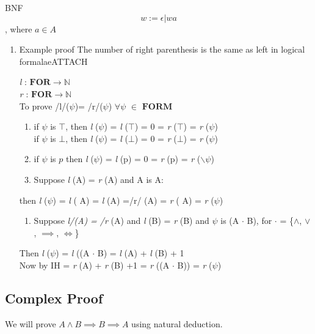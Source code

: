 \documentclass[11pt]{article}
\begin{document}
BNF \\
$$w:= \epsilon | wa$$,  where \(a\in A\)
\begin{enumerate}
\item Example proof The number of right parenthesis is the same as left in logical formalae\hfill{}\textsc{ATTACH}
\label{sec:orgd75f034}


\emph{l} : \(\mathbf{FOR} \rightarrow \mathbb{N}\) \\
\emph{r} : \(\mathbf{FOR} \rightarrow \mathbb{N}\) \\
To prove /l/(\(\psi\))= /r/(\(\psi\)) \(\forall \psi\) \(\in\) \(\mathbf{FORM}\)


\begin{enumerate}
\item if \(\psi\) is \(\top\), then \emph{l} (\(\psi\)) = \emph{l} (\(\top\)) = 0 = \emph{r} (\(\top\)) = \emph{r} (\(\psi\)) \\
if \(\psi\) is \(\bot\), then \emph{l} (\(\psi\)) = \emph{l} (\(\bot\)) = 0 = \emph{r} (\(\bot\)) = \emph{r} (\(\psi\))
\item if \(\psi\) is \(p\) then \emph{l} (\(\psi\)) = \emph{l} (p) = 0 = \emph{r} (p) = \emph{r} ($\backslash$\(\psi\))
\item Suppose \emph{l} (A) = \emph{r} (A) and A is \textlnot{} A: \\
\end{enumerate}
then \emph{l} (\(\psi\)) = \emph{l} (\textlnot{} A) = \emph{l} (A) =/r/ (A) = \emph{r} (\textlnot{} A) = \emph{r} (\(\psi\))
\begin{enumerate}
\item Suppose \emph{l/(A)  = /r} (A) and \emph{l} (B) = \emph{r} (B) and \(\psi\) is (A \(\cdot\) B), for \(\cdot\) = \{\(\land\), \(\lor\), \(\implies\), \(\iff\)\} \\
\end{enumerate}
Then \emph{l} (\(\psi\)) = \emph{l} ((A \(\cdot\) B) = \emph{l} (A) + \emph{l} (B) + 1 \\
Now by IH = \emph{r} (A) + \emph{r} (B) +1 = \emph{r} ((A \(\cdot\) B)) = \emph{r} (\(\psi\))
\end{enumerate}
\subsection{Complex Proof}
\label{sec:org53607b5}
We will prove \(A \land B \implies B \implies A\) using natural deduction.

\begin{LATEX}
\begin{prooftree}
\end{prooftree}
\end{LATEX}
\end{document}
